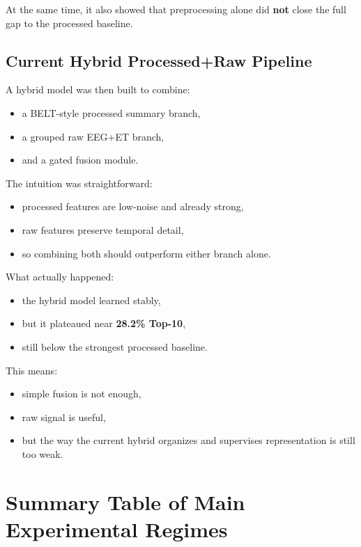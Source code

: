 \documentclass[11pt]{article}
\begin{document}
At the same time, it also showed that preprocessing alone did \textbf{not} close the full gap to the processed baseline.

\subsection{Current Hybrid Processed+Raw Pipeline}

A hybrid model was then built to combine:
\begin{itemize}
    \item a BELT-style processed summary branch,
    \item a grouped raw EEG+ET branch,
    \item and a gated fusion module.
\end{itemize}

The intuition was straightforward:
\begin{itemize}
    \item processed features are low-noise and already strong,
    \item raw features preserve temporal detail,
    \item so combining both should outperform either branch alone.
\end{itemize}

What actually happened:
\begin{itemize}
    \item the hybrid model learned stably,
    \item but it plateaued near \textbf{28.2\% Top-10},
    \item still below the strongest processed baseline.
\end{itemize}

This means:
\begin{itemize}
    \item simple fusion is not enough,
    \item raw signal is useful,
    \item but the way the current hybrid organizes and supervises representation is still too weak.
\end{itemize}

\section{Summary Table of Main Experimental Regimes}
\end{document}
